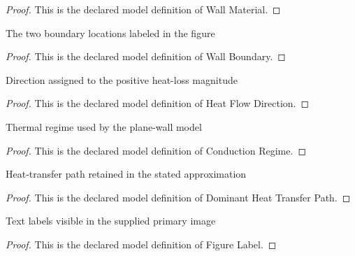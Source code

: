 \begin{proof}
  This is the declared model definition of Wall Material.
\end{proof}
\begin{definition}
  \label{def:physics:phyx-mini-0487:phyxminiproblems-problemphyxmini0487-wallboundary}
  The two boundary locations labeled in the figure
\end{definition}
\begin{proof}
  This is the declared model definition of Wall Boundary.
\end{proof}
\begin{definition}
  \label{def:physics:phyx-mini-0487:phyxminiproblems-problemphyxmini0487-heatflowdirection}
  Direction assigned to the positive heat-loss magnitude
\end{definition}
\begin{proof}
  This is the declared model definition of Heat Flow Direction.
\end{proof}
\begin{definition}
  \label{def:physics:phyx-mini-0487:phyxminiproblems-problemphyxmini0487-conductionregime}
  Thermal regime used by the plane-wall model
\end{definition}
\begin{proof}
  This is the declared model definition of Conduction Regime.
\end{proof}
\begin{definition}
  \label{def:physics:phyx-mini-0487:phyxminiproblems-problemphyxmini0487-dominantheattransferpath}
  Heat-transfer path retained in the stated approximation
\end{definition}
\begin{proof}
  This is the declared model definition of Dominant Heat Transfer Path.
\end{proof}
\begin{definition}
  \label{def:physics:phyx-mini-0487:phyxminiproblems-problemphyxmini0487-figurelabel}
  Text labels visible in the supplied primary image
\end{definition}
\begin{proof}
  This is the declared model definition of Figure Label.
\end{proof}
